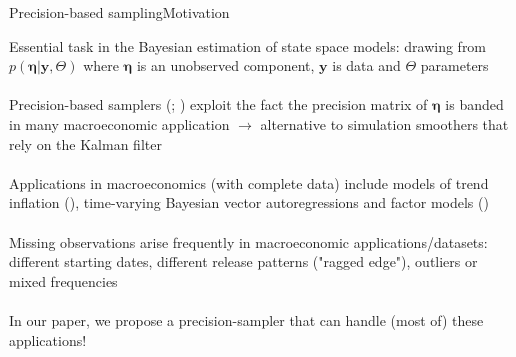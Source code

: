 \documentclass[xcolor=svgnames, 10pt, aspectratio=169]{beamer}
\begin{document}
\begin{frame}{Precision-based sampling}{Motivation}

Essential task in the Bayesian estimation of state space models: drawing from $p(\boldsymbol{\eta} | \mathbf{y}, \Theta)$ where $\boldsymbol{\eta}$ is an unobserved component, $\mathbf{y}$ is data and $\Theta$ parameters \\~\\

Precision-based samplers (\citealp[][\scriptsize \textbf{IJMMNO}\normalsize]{chanjelizakov_2009}; \citealp[][\scriptsize \textbf{JEcmtrics}\normalsize]{mccausland_2012}) exploit the fact the precision matrix of $\boldsymbol{\eta}$ is banded in many macroeconomic application $\rightarrow$ alternative to simulation smoothers that rely on the Kalman filter \\~\\

Applications in macroeconomics (with complete data) include models of trend inflation (\citealp[][\scriptsize \textbf{JBES}\normalsize]{chankooppotter_jae2013}), time-varying Bayesian vector autoregressions \citep[][\scriptsize \textbf{JBES}\normalsize]{chan_2020jbes} and factor models (\citealp[][\scriptsize \textbf{JAE}\normalsize]{kaufmannschumacher_jae2017})\\~\\

Missing observations arise frequently in macroeconomic applications/datasets: different starting dates, different release patterns ("ragged edge"), outliers or mixed frequencies\\~\\

In our paper, we propose a precision-sampler that can handle (most of) these applications! 

\end{frame}
\end{document}
